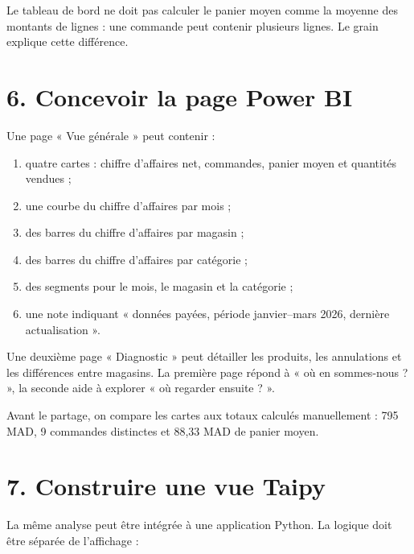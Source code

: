 \documentclass[
  french,
  letterpaper,
  open=any]{scrbook}
\providecommand{\tightlist}{%
  \setlength{\itemsep}{0pt}\setlength{\parskip}{0pt}}
\theoremstyle{definition}
\theoremstyle{definition}
\theoremstyle{remark}
\begin{document}
Le tableau de bord ne doit pas calculer le panier moyen comme la moyenne
des montants de lignes : une commande peut contenir plusieurs lignes. Le
grain explique cette différence.

\section{6. Concevoir la page Power
BI}\label{concevoir-la-page-power-bi}

Une page « Vue générale » peut contenir :

\begin{enumerate}
\def\labelenumi{\arabic{enumi}.}
\tightlist
\item
  quatre cartes : chiffre d'affaires net, commandes, panier moyen et
  quantités vendues ;
\item
  une courbe du chiffre d'affaires par mois ;
\item
  des barres du chiffre d'affaires par magasin ;
\item
  des barres du chiffre d'affaires par catégorie ;
\item
  des segments pour le mois, le magasin et la catégorie ;
\item
  une note indiquant « données payées, période janvier--mars 2026,
  dernière actualisation ».
\end{enumerate}

Une deuxième page « Diagnostic » peut détailler les produits, les
annulations et les différences entre magasins. La première page répond à
« où en sommes-nous ? », la seconde aide à explorer « où regarder
ensuite ? ».

Avant le partage, on compare les cartes aux totaux calculés manuellement
: 795 MAD, 9 commandes distinctes et 88,33 MAD de panier moyen.

\section{7. Construire une vue Taipy}\label{construire-une-vue-taipy}

La même analyse peut être intégrée à une application Python. La logique
doit être séparée de l'affichage :
\end{document}
